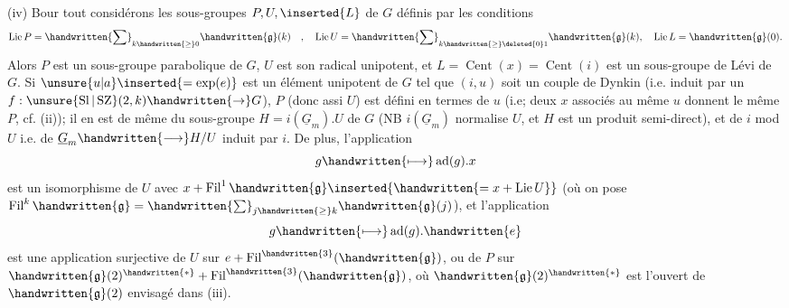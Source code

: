 (iv) Bour tout  considérons les sous-groupes $P,U,\inserted{L}$ de $G$ définis par les conditions
\[
\operatorname{Lie}P=\handwritten{\sum}_{k\handwritten{\geq}0}\handwritten{\mathfrak{g}}(k)\quad,\quad
\operatorname{Lie}U=\handwritten{\sum}_{k\handwritten{\geq}\deleted{0}1}\handwritten{\mathfrak{g}}(k),\quad
\operatorname{Lie}L=\handwritten{\mathfrak{g}}(0).
\]
Alors $P$ est un sous-groupe parabolique de $G$, $U$ est son radical unipotent, et $L=\operatorname{Cent}(x)=\operatorname{Cent}(i)$  est un sous-groupe de Lévi de $G$. Si $\unsure{u|a}\inserted{=\exp(e)}$ est un élément unipotent de $G$ tel que $(i,u)$ soit un couple de Dynkin (i.e. induit par un $f:\unsure{\operatorname{Sl}|\operatorname{SZ}}(2,k)\handwritten{\to}G$), $P$ (donc assi $U$) est défini en termes de $u$ (i.e; deux $x$ associés au même $u$ donnent le même $P$, cf. (ii)); il en est de même du sous-groupe $H=i(\underline{G}_m).U$ de $G$ (NB $i(\underline{G}_m)$ normalise $U$, et $H$ est un produit semi-direct), et de $i$ mod $U$ i.e. de $\underline{G}_m\handwritten{\longrightarrow}H/U$ induit par $i$. De plus, l'application
\[
g\handwritten{\longmapsto}\operatorname{ad}(g).x
\]
est un isomorphisme de $U$ avec $x+\operatorname{Fil}^{1}\handwritten{\mathfrak{g}}\inserted{\handwritten{=x+\operatorname{Lie}U}}$ (où on pose $\operatorname{Fil}^{k}\handwritten{\mathfrak{g}}=\handwritten{\sum}_{j\handwritten{\geq}k}\handwritten{\mathfrak{g}}(j)$), et l'application
\[
g\handwritten{\longmapsto}\operatorname{ad}(g).\handwritten{e}
\]
est une application surjective de $U$ sur $e+\operatorname{Fil}^{\handwritten{3}}(\handwritten{\mathfrak{g}})$, ou de $P$ sur $\handwritten{\mathfrak{g}}(2)^{\handwritten{*}}+\operatorname{Fil}^{\handwritten{3}}(\handwritten{\mathfrak{g}})$, où $\handwritten{\mathfrak{g}}(2)^{\handwritten{*}}$ est l'ouvert de $\handwritten{\mathfrak{g}}(2)$ envisagé dans (iii).
